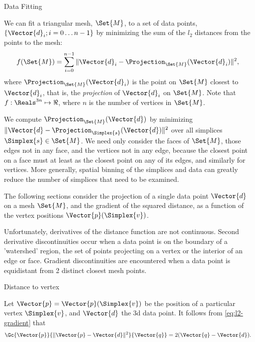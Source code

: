 \begin{plSection}{Data Fitting}
\label{sec:data-fitting}

We can fit a triangular mesh, $\Set{M}$, to a set of data points, 
$\{\Vector{d}_i; i=0 \ldots n-1\}$
by minimizing the sum of the $l_2$ distances from the points to the mesh:
\begin{equation}
f(\Set{M}) = \sum_{i=0}^{n-1} 
\| \Vector{d}_i - \Projection_\Set{M} (\Vector{d}_i) \|^2 ,
\end{equation}
where $\Projection_\Set{M} (\Vector{d}_i)$ 
is the point on $\Set{M}$ closest to $\Vector{d}_i$,
that is, the {\em projection} of $\Vector{d}_i$ on $\Set{M}$.
Note that $f:\Reals^{3n} \mapsto \Re$,
where $n$ is the number of vertices in $\Set{M}$.

We compute $\Projection_\Set{M} (\Vector{d})$ by minimizing  
$\| \Vector{d} - \Projection_\Simplex{s} (\Vector{d}) \|^2$
over all simplices $\Simplex{s} \in \Set{M}$.
We need only consider the faces of $\Set{M}$,
those edges not in any face,
and the vertices not in any edge,
because the closest point on a face must at least
as the closest point on any of its edges,
and similarly for vertices.
More generally, spatial binning of the simplices and data can greatly
reduce the number of simplices that need to be examined.

The following sections consider the projection of a single
data point $\Vector{d}$ on a mesh $\Set{M}$,
and the gradient of the squared distance,
as a function of the vertex positions $\Vector{p}(\Simplex{v})$.

Unfortunately, derivatives of the distance function are not continuous.
Second derivative discontinuities occur
when a data point is on the boundary
of a 'watershed' region, the set of points
projecting on a vertex or the interior of an edge or face.
Gradient discontinuities are encountered
when a data point is equidistant from 2 distinct closest mesh points.

\begin{plSection}{Distance to vertex}
\label{sec:Distance-to-vertex}

Let $\Vector{p} = \Vector{p}(\Simplex{v})$ be the position of a particular vertex $\Simplex{v}$,
and $\Vector{d}$ the 3d data point.
It follows from \cref{eq:l2-gradient} that
\begin{equation}
\label{eq:vertex-distance-gradient}
\Gc{\Vector{p}}{\| \Vector{p} - \Vector{d} \|^2}{\Vector{q}} = 2 ( \Vector{q} - \Vector{d} ).
\end{equation}


\end{plSection}
\end{plSection}

